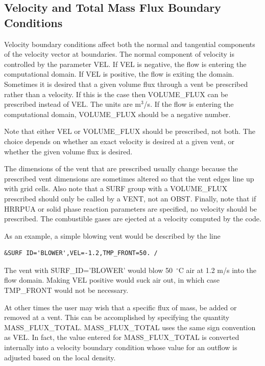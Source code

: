 \documentclass[11pt]{book}
\begin{document}
\subsection{Velocity and Total Mass Flux Boundary Conditions}

Velocity boundary conditions affect both the normal and tangential
components of the velocity vector at boundaries.
The normal component of velocity is controlled by the parameter
{\ct VEL}. If {\ct VEL} is negative, the flow is entering the
computational domain. If {\ct VEL} is positive, the flow is exiting the
domain.
Sometimes it is desired that a given volume flux through a vent
be prescribed rather than a velocity. If this is the case then
{\ct VOLUME\_FLUX} can be prescribed instead of {\ct VEL}. The units
are m$^3$/s.
If the flow is entering the computational domain, {\ct VOLUME\_FLUX}
should be a negative number.
\begin{warning}
\noindent
Note that either {\ct VEL} or {\ct VOLUME\_FLUX} should be prescribed,
not both.  The choice depends on whether an exact velocity is desired at a
given vent, or whether the given volume flux is desired.
\end{warning}
The dimensions of the vent that are prescribed usually change
because the prescribed vent dimensions are sometimes altered so that
the vent edges line up with grid cells. Also note that a {\ct SURF}
group with a {\ct VOLUME\_FLUX} prescribed should only be called by a
{\ct VENT}, not an {\ct OBST}.
Finally, note that if {\ct HRRPUA} or solid phase reaction parameters are
specified, no velocity should be prescribed. The combustible gases
are ejected at a velocity computed by the code.

As an example, a simple blowing vent would be described by the line

\footnotesize
\begin{verbatim}
&SURF ID='BLOWER',VEL=-1.2,TMP_FRONT=50. /
\end{verbatim}
\normalsize
The vent with {\ct SURF\_ID='BLOWER'} would blow 50~$^\circ$C
air at 1.2 m/s into the flow domain. Making {\ct VEL} positive would
suck air out, in which case {\ct TMP\_FRONT} would not be necessary.

At other times the user may wish that a specific flux of mass, be added or removed at
a vent.  This can be accomplished by specifying the quantity {\ct MASS\_FLUX\_TOTAL}.
{\ct MASS\_FLUX\_TOTAL} uses the same sign convention as {\ct VEL}.  In fact, the value entered for
{\ct MASS\_FLUX\_TOTAL} is converted internally into a velocity boundary condition whose value
for an outflow is adjusted based on the local density.
\end{document}
